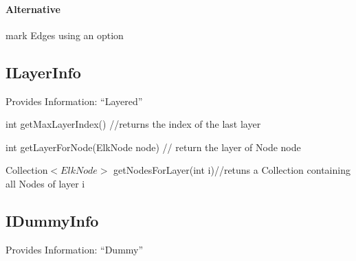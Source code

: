 \paragraph{Alternative}
	mark Edges using an option
	
\subsection{ILayerInfo}
Provides Information: "`Layered"'

\begin{list}{}{Functions:}
\item int getMaxLayerIndex() //returns the index of the last layer
\item int getLayerForNode(ElkNode node) // return the layer of Node node
\item Collection$<ElkNode>$ getNodesForLayer(int i)//retuns a Collection containing all Nodes of layer i
\end{list}

\subsection{IDummyInfo}
Provides Information: "`Dummy"'
